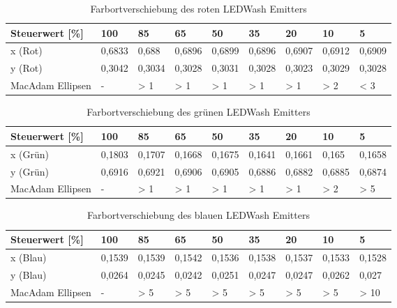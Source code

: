 \documentclass[11pt]{scrartcl}
\begin{document}
\noindent
\clearpage
\begin{table}[H]
    \begin{tabularx}{\textwidth}{|l|X|X|X|X|X|X|X|X|}
        \hline
        Steuerwert [\%]  & 100    & 85     & 65     & 50     & 35     & 20     & 10     & 5      \\\hline
        x (Rot)          & 0,6833 & 0,688 & 0,6896  & 0,6899 & 0,6896 & 0,6907 & 0,6912 & 0,6909 \\\hline
        y (Rot)          & 0,3042 & 0,3034 & 0,3028 & 0,3031 & 0,3028 & 0,3023 & 0,3029 & 0,3028 \\\hline
        MacAdam Ellipsen & -      & > 1    & > 1    & > 1    & > 1    & > 1    & > 2    & < 3    \\\hline
    \end{tabularx}
    \caption{Farbortverschiebung des roten LEDWash Emitters}
\end{table}
\noindent
\begin{table}[H]
    \begin{tabularx}{\textwidth}{|l|X|X|X|X|X|X|X|X|}
        \hline
        Steuerwert [\%]  & 100    & 85     & 65     & 50     & 35     & 20     & 10     & 5      \\\hline
        x (Grün)         & 0,1803 & 0,1707 & 0,1668 & 0,1675 & 0,1641 & 0,1661 & 0,165 & 0,1658  \\\hline
        y (Grün)         & 0,6916 & 0,6921 & 0,6906 & 0,6905 & 0,6886 & 0,6882 & 0,6885 & 0,6874 \\\hline
        MacAdam Ellipsen & -      & > 1    & > 1    & > 1    & > 1    & > 1    & > 2    & > 5    \\\hline
    \end{tabularx}
    \caption{Farbortverschiebung des grünen LEDWash Emitters}
\end{table}
\noindent
\begin{table}[H]
    \begin{tabularx}{\textwidth}{|l|X|X|X|X|X|X|X|X|}
        \hline
        Steuerwert [\%]  & 100    & 85     & 65     & 50     & 35     & 20     & 10     & 5      \\\hline
        x (Blau)         & 0,1539 & 0,1539 & 0,1542 & 0,1536 & 0,1538 & 0,1537 & 0,1533 & 0,1528 \\\hline
        y (Blau)         & 0,0264 & 0,0245 & 0,0242 & 0,0251 & 0,0247 & 0,0247 & 0,0262 & 0,027  \\\hline
        MacAdam Ellipsen & -      & > 5    & > 5    & > 5    & > 5    & > 5    & > 5    & > 10   \\\hline
    \end{tabularx}
    \caption{Farbortverschiebung des blauen LEDWash Emitters}
\end{table}
\end{document}
